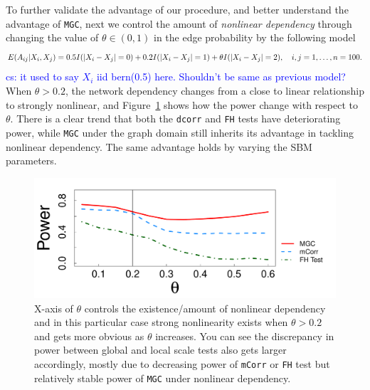 \documentclass[11pt]{article}
\theoremstyle{definition}
\newcommand{\cs}[1]{\textcolor{blue}{cs: #1}}
\begin{document}
To further validate the advantage of our procedure, and better understand the advantage of \texttt{MGC}, next we control the amount of \textit{nonlinear dependency} through changing the value of $\theta \in (0, 1)$ in the edge probability by the following model
\begin{equation}
E(A_{ij} | X_{i}, X_{j}) = 0.5 I(|X_{i} - X_{j}| = 0) + 0.2 I(|X_{i} - X_{j}| = 1) + \theta I(|X_{i} - X_{j}| = 2), \quad i,j = 1, \ldots, n = 100.
\label{eq:mono}
\vspace*{-0.4cm}
\end{equation}
\cs{it used to say $X_i$ iid bern(0.5) here. Shouldn't be same as previous model?} 
When $\theta > 0.2$, the network dependency changes from a close to linear relationship to strongly nonlinear, and Figure~\ref{fig:powerplot} shows how the power change with respect to $\theta$. There is a clear trend that both the \texttt{dcorr} and \texttt{FH} tests have deteriorating power, while \texttt{MGC} under the graph domain still inherits its advantage in tackling nonlinear dependency. The same advantage holds by varying the SBM parameters.
\begin{figure}[ht]
	\centering
	\includegraphics[width=0.7\linewidth]{mono_simple.pdf}
	\caption{X-axis of $\theta$ controls the existence/amount of nonlinear dependency and in this particular case strong nonlinearity exists when $\theta > 0.2$ and gets more obvious as $\theta$ increases. You can see the discrepancy in power between global and local scale tests also gets larger accordingly, mostly due to decreasing power of \texttt{mCorr} or \texttt{FH} test but relatively stable power of \texttt{MGC} under nonlinear dependency.}
	\label{fig:powerplot}
\end{figure}
\end{document}
